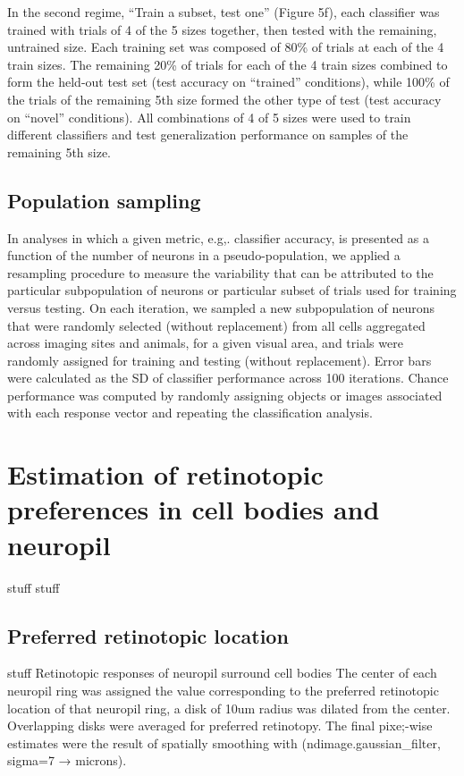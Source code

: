 In the second regime, “Train a subset, test one” (Figure 5f),  each classifier was trained with trials of  4 of the 5 sizes together, then tested with the remaining, untrained size. Each training set was composed of 80\% of trials at each of the 4 train sizes. The remaining 20\% of trials for each of the 4 train sizes combined to form the held-out test set (test accuracy on “trained” conditions), while 100\% of the trials of the remaining 5th size formed the other type of test (test accuracy on “novel” conditions). All combinations of 4 of 5 sizes were used to train different classifiers and test generalization performance on samples of the remaining 5th size.

\subsection{Population sampling}
In analyses in which a given metric, e.g,. classifier accuracy, is presented as a function of the number of neurons in a pseudo-population, we applied a resampling procedure to measure the variability that can be attributed to the particular subpopulation of neurons or particular subset of trials used for training versus testing. On each iteration, we sampled a new subpopulation of neurons that were randomly selected (without replacement) from all cells aggregated across imaging sites and animals, for a given visual area, and trials were randomly assigned for training and testing (without replacement). Error bars were calculated as the SD of classifier performance across 100 iterations. Chance performance was computed by randomly assigning objects or images associated with each response vector and repeating the classification analysis.

\section{Estimation of retinotopic preferences in cell bodies and neuropil}
stuff
stuff


\subsection{Preferred retinotopic location}
stuff
Retinotopic responses of neuropil surround cell bodies
The center of each neuropil ring was assigned the value corresponding to the preferred retinotopic location of that neuropil ring, a disk of 10um radius was dilated from the center. Overlapping disks were averaged for preferred retinotopy. The final pixe;-wise estimates were the result of spatially smoothing with (ndimage.gaussian_filter, sigma=7 → microns). 

